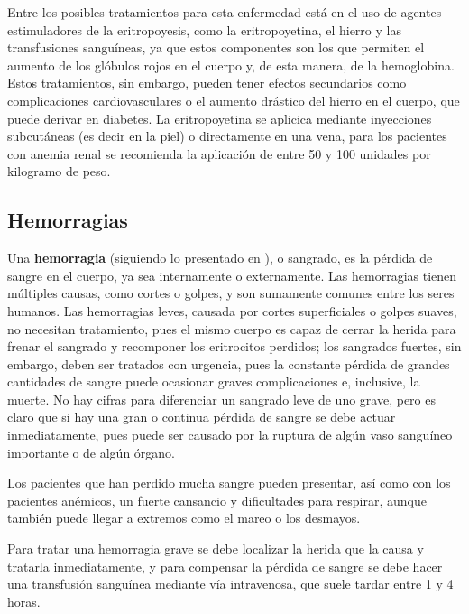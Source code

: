 Entre los posibles tratamientos para esta enfermedad está en el uso de agentes estimuladores de la eritropoyesis, como la eritropoyetina, el hierro y las transfusiones sanguíneas, ya que estos componentes son los que permiten el aumento de los glóbulos rojos en el cuerpo y, de esta manera, de la hemoglobina. Estos tratamientos, sin embargo, pueden tener efectos secundarios como complicaciones cardiovasculares o el aumento drástico del hierro en el cuerpo, que puede derivar en diabetes. La eritropoyetina se aplicica mediante inyecciones subcutáneas (es decir en la piel) o directamente en una vena, para los pacientes con anemia renal se recomienda la aplicación de entre 50 y 100 unidades por kilogramo de peso.

\subsection{Hemorragias}
Una \textbf{hemorragia} (siguiendo lo presentado en \cite{Sanchez2000Hemorragias}), o sangrado, es la pérdida de sangre en el cuerpo, ya sea internamente o externamente. Las hemorragias tienen múltiples causas, como cortes o golpes, y son sumamente comunes entre los seres humanos. Las hemorragias leves, causada por cortes superficiales o golpes suaves, no necesitan tratamiento, pues el mismo cuerpo es capaz de cerrar la herida para frenar el sangrado y recomponer los eritrocitos perdidos; los sangrados fuertes, sin embargo, deben ser tratados con urgencia, pues la constante pérdida de grandes cantidades de sangre puede ocasionar graves complicaciones e, inclusive, la muerte. No hay cifras para diferenciar un sangrado leve de uno grave, pero es claro que si hay una gran o continua pérdida de sangre se debe actuar inmediatamente, pues puede ser causado por la ruptura de algún vaso sanguíneo importante o de algún órgano.

Los pacientes que han perdido mucha sangre pueden presentar, así como con los pacientes anémicos, un fuerte cansancio y dificultades para respirar, aunque también puede llegar a extremos como el mareo o los desmayos.

Para tratar una hemorragia grave se debe localizar la herida que la causa y tratarla inmediatamente, y para compensar la pérdida de sangre se debe hacer una transfusión sanguínea mediante vía intravenosa, que suele tardar entre 1 y 4 horas. 